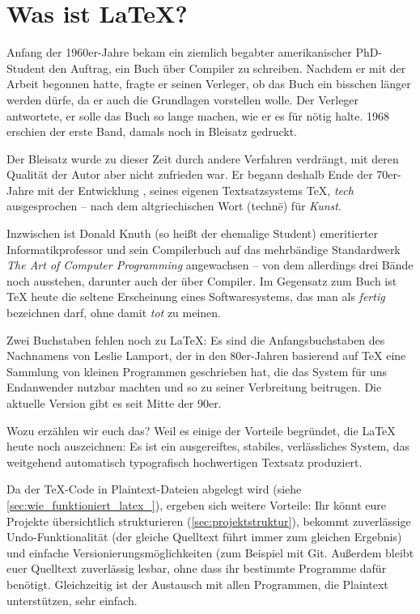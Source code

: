 \section{Was ist \LaTeX?}

Anfang der 1960er-Jahre bekam ein ziemlich begabter amerikanischer PhD-Student den Auftrag, ein Buch über Compiler zu schreiben.
Nachdem er mit der Arbeit begonnen hatte, fragte er seinen Verleger, ob das Buch ein bisschen länger werden dürfe, da er auch die Grundlagen vorstellen wolle.
Der Verleger antwortete, er solle das Buch so lange machen, wie er es für nötig halte.
1968 erschien der erste Band, damals noch in Bleisatz gedruckt.

Der Bleisatz wurde zu dieser Zeit durch andere Verfahren verdrängt, mit deren Qualität der Autor aber nicht zufrieden war. 
Er begann deshalb Ende der 70er-Jahre mit der Entwicklung , seines eigenen Textsatzsystems \TeX, \emph{tech} ausgesprochen – nach dem altgriechischen Wort \texttau\textepsilon{}\textchi\textnu\texteta{} (technē) für \emph{Kunst}.

Inzwischen ist Donald Knuth (so heißt der ehemalige Student) emeritierter Informatikprofessor und sein Compilerbuch auf das mehrbändige Standardwerk \emph{The Art of Computer Programming} angewachsen – von dem allerdings drei Bände noch ausstehen, darunter auch der über Compiler.
Im Gegensatz zum Buch ist \TeX{} heute die seltene Erscheinung eines Softwaresystems, das man als \emph{fertig} bezeichnen darf, ohne damit \emph{tot} zu meinen.

Zwei Buchstaben fehlen noch zu \LaTeX: 
Es sind die Anfangsbuchstaben des Nachnamens von Leslie Lamport, der in den 80er-Jahren basierend auf \TeX{} eine Sammlung von kleinen Programmen geschrieben hat, die das System für uns Endanwender nutzbar machten und so zu seiner Verbreitung beitrugen.
Die aktuelle Version \LaTeXe{} gibt es seit Mitte der 90er.

Wozu erzählen wir euch das? 
Weil es einige der Vorteile begründet, die \LaTeX{} heute noch auszeichnen:
Es ist ein ausgereiftes, stabiles, verlässliches System,
das weitgehend automatisch typografisch hochwertigen Textsatz produziert.

Da der \TeX-Code in Plaintext-Dateien abgelegt wird (siehe \cref{sec:wie_funktioniert_latex_}), ergeben sich weitere Vorteile:
Ihr könnt eure Projekte übersichtlich strukturieren (\cref{sec:projektstruktur}), bekommt zuverlässige Undo-Funktionalität (der gleiche Quelltext führt immer zum gleichen Ergebnis) und einfache Versionierungsmöglichkeiten (zum Beispiel mit Git.
Außerdem bleibt euer Quelltext zuverlässig lesbar, ohne dass ihr bestimmte Programme dafür benötigt.
Gleichzeitig ist der Austausch mit allen Programmen, die Plaintext unterstützen, sehr einfach.

